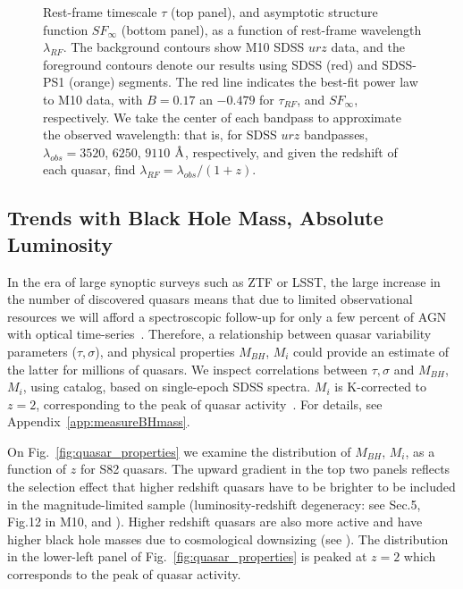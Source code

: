 \documentclass[twocolumn]{aastex62}
\let\oldAA\AA
\renewcommand{\AA}{\text{\normalfont\oldAA}}
\begin{document}
  
\begin{figure} %
\caption{Rest-frame timescale $\tau$ (top panel), and asymptotic structure function $SF_{\infty}$ (bottom panel), as a function of rest-frame wavelength $\lambda_{RF}$. The background contours show M10 SDSS $ urz $  data, and the foreground contours  denote our results using  SDSS (red) and SDSS-PS1 (orange) segments. The red line indicates the best-fit power law to M10 data, with $B=0.17$ an $-0.479$ for $\tau_{RF}$, and $SF_{\infty}$, respectively. We take the center of each bandpass to approximate the  observed wavelength: that is, for SDSS $urz$ bandpasses,  $\lambda_{obs} = 3520$, $6250$, $9110$ $\mbox{\AA}$, respectively, and given the redshift of each quasar, find $\lambda_{RF}=\lambda_{obs} / (1+z)$.}
\label{fig:lambda_dependence}
\end{figure} 




\subsection{Trends with Black Hole Mass, Absolute Luminosity}

In the era of large synoptic surveys such as ZTF or LSST, the large increase in the number of discovered quasars means that due to limited observational resources we will afford a spectroscopic follow-up for only a few percent of AGN with optical time-series~\citep{ivezic2019}. Therefore, a relationship between quasar variability parameters ($\tau, \sigma$), and physical properties $M_{BH}$, $M_{i}$ could provide an estimate of the latter for millions of quasars. We inspect correlations between $\tau, \sigma$  and $M_{BH}$, $M_{i}$, using \cite{shen2011} catalog, based on single-epoch SDSS spectra. $M_{i}$ is K-corrected to  $z= 2$, corresponding to the peak of quasar activity~\citep{richards2006a}. For details, see Appendix~\ref{app:measureBHmass}.

On Fig.~\ref{fig:quasar_properties} we examine the distribution of $M_{BH}$, $M_{i}$, as a function of $z$ for S82 quasars. The upward gradient in the top two panels reflects the selection effect that higher redshift quasars have to be brighter to be included in the magnitude-limited sample (luminosity-redshift degeneracy: see Sec.5, Fig.12 in M10, and \citealt{dong2018}). Higher redshift quasars are also more active  and have higher black hole masses due to cosmological downsizing (see \citealt{babic2007,labita2009, mclure2004}). The distribution in the lower-left panel of Fig.~\ref{fig:quasar_properties} is peaked at $z=2$ which corresponds to the peak of quasar activity. 
\end{document}

